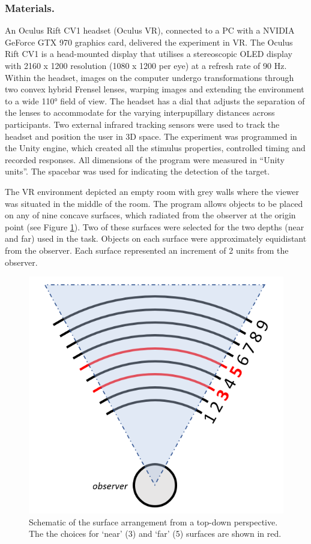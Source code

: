 \documentclass[
  man,floatsintext]{apa7}
\begin{document}
\hypertarget{materials.}{%
\subsubsection{Materials.}\label{materials.}}

An Oculus Rift CV1 headset (Oculus VR), connected to a PC with a NVIDIA GeForce GTX 970 graphics card, delivered the experiment in VR. The Oculus Rift CV1 is a head-mounted display that utilises a stereoscopic OLED display with 2160 x 1200 resolution (1080 x 1200 per eye) at a refresh rate of 90 Hz. Within the headset, images on the computer undergo transformations through two convex hybrid Frensel lenses, warping images and extending the environment to a wide 110° field of view. The headset has a dial that adjusts the separation of the lenses to accommodate for the varying interpupillary distances across participants. Two external infrared tracking sensors were used to track the headset and position the user in 3D space. The experiment was programmed in the Unity engine, which created all the stimulus properties, controlled timing and recorded responses. All dimensions of the program were measured in ``Unity units''. The spacebar was used for indicating the detection of the target.

The VR environment depicted an empty room with grey walls where the viewer was situated in the middle of the room. The program allows objects to be placed on any of nine concave surfaces, which radiated from the observer at the origin point (see Figure \ref{fig:schematic}). Two of these surfaces were selected for the two depths (near and far) used in the task. Objects on each surface were approximately equidistant from the observer. Each surface represented an increment of 2 units from the observer.



\begin{figure}

{\centering \includegraphics[width=0.6\linewidth]{VR_schematic} 

}

\caption{Schematic of the surface arrangement from a top-down perspective. The the choices for `near' (3) and `far' (5) surfaces are shown in red.}\label{fig:schematic}
\end{figure}
\end{document}
